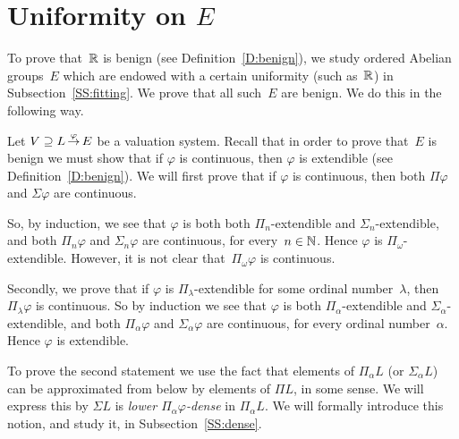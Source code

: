 \documentclass[main.tex]{subfiles}
\begin{document}
\section{Uniformity on $E$}
To prove that~$\mathbb{R}$
is benign (see Definition~\ref{D:benign}),
we study
ordered Abelian groups~$E$ which are endowed with
a certain uniformity (such as~$\mathbb{R}$)
in Subsection~\ref{SS:fitting}.
We prove that all such~$E$ are benign.
We do this in the following way.

Let $V \supseteq L\,\smash{\stackrel{\varphi}{\rightarrow}}\,E$ be a valuation system.
Recall that in order to prove that~$E$ is benign
 we must show that 
if $\varphi$ is continuous,
then $\varphi$ is extendible (see Definition~\ref{D:benign}).
We will first prove that
if $\varphi$ is continuous,
then both $\Pi \varphi$ and $\Sigma \varphi$ are continuous.

So, by induction,
we see that $\varphi$ is
both both $\Pi_n$-extendible and $\Sigma_n$-extendible,
and both $\Pi_n\varphi$  and $\Sigma_n \varphi$
are continuous,
for every~$n\in \mathbb{N}$.
Hence $\varphi$ is $\Pi_\omega$-extendible.
However,
it is not clear that~$\Pi_\omega\varphi$
is continuous.

Secondly,
we prove that if 
$\varphi$ is $\Pi_\lambda$-extendible
for some ordinal number~$\lambda$,
then $\Pi_\lambda\varphi$ is continuous.
So by induction
we see that $\varphi$ is both $\Pi_\alpha$-extendible
and $\Sigma_\alpha$-extendible,
and both $\Pi_\alpha\varphi$ and $\Sigma_\alpha\varphi$
are continuous,
for every ordinal number~$\alpha$.
Hence $\varphi$ is extendible.

To prove the second statement
we use the fact that
elements of $\Pi_\alpha L$ (or $\Sigma_\alpha L$)
can be approximated from below
by elements of $\Pi L$, in some sense.
We will express this by
$\Sigma L$ is \emph{lower $\Pi_\alpha \varphi$-dense}
in $\Pi_\alpha L$.
We will formally introduce this notion,
and study it, in Subsection~\ref{SS:dense}.
\end{document}
